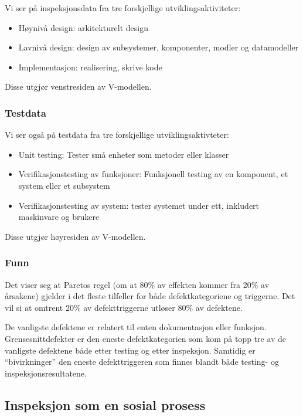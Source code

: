 Vi ser på inspeksjonsdata fra tre forskjellige utviklingsaktiviteter:

\begin{itemize}
\item
  Høynivå design: arkitekturelt design
\item
  Lavnivå design: design av subsystemer, komponenter, modler og
  datamodeller
\item
  Implementasjon: realisering, skrive kode
\end{itemize}
Disse utgjør venstresiden av V-modellen.

\subsubsection{Testdata}

Vi ser også på testdata fra tre forskjellige utviklingsaktivteter:

\begin{itemize}
\item
  Unit testing: Tester små enheter som metoder eller klasser
\item
  Verifikasjonstesting av funksjoner: Funksjonell testing av en
  komponent, et system eller et subsystem
\item
  Verifikasjonstesting av system: tester systemet under ett, inkludert
  maskinvare og brukere
\end{itemize}
Disse utgjør høyresiden av V-modellen.

\subsubsection{Funn}

Det viser seg at Paretos regel (om at 80\% av effekten kommer fra 20\%
av årsakene) gjelder i det fleste tilfeller for både defektkategoriene
og triggerne. Det vil si at omtrent 20\% av defekttriggerne utløser 80\%
av defektene.

De vanligste defektene er relatert til enten dokumentasjon eller
funksjon. Grensesnittdefekter er den eneste defektkategorien som kom på
topp tre av de vanligste defektene både etter testing og etter
inspeksjon. Samtidig er ``bivirkninger'' den eneste defekttriggeren som
finnes blandt både testing- og inspeksjonsresultatene.

\subsection{Inspeksjon som en sosial prosess}

